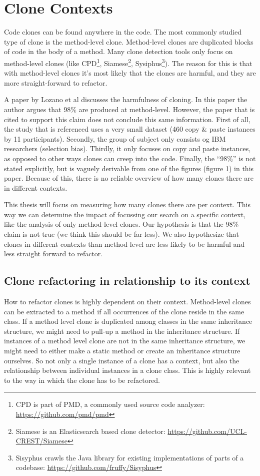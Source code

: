 \documentclass{report}
\theoremstyle{definition}
\theoremstyle{remark}
\begin{document}
\section{Clone Contexts}
Code clones can be found anywhere in the code. The most commonly studied type of clone is the method-level clone. Method-level clones are duplicated blocks of code in the body of a method. Many clone detection tools only focus on method-level clones (like CPD\footnote{CPD is part of PMD, a commonly used source code analyzer: \url{https://github.com/pmd/pmd}}, Siamese\footnote{Siamese is an Elasticsearch based clone detector: \url{https://github.com/UCL-CREST/Siamese}}, Sysiphus\footnote{Sisyphus crawls the Java library for existing implementations of parts of a codebase: \url{https://github.com/fruffy/Sisyphus}}). The reason for this is that with method-level clones it's most likely that the clones are harmful, and they are more straight-forward to refactor.

A paper by Lozano et al \cite{lozano2007evaluating} discusses the harmfulness of cloning. In this paper the author argues that 98\% are produced at method-level. However, the paper that is cited to support this claim \cite{bergman2004ethnographic} does not conclude this same information. First of all, the study that is referenced uses a very small dataset (460 copy \& paste instances by 11 participants). Secondly, the group of subject only consists og IBM researchers (selection bias). Thirdly, it only focuses on copy and paste instances, as opposed to other ways clones can creep into the code. Finally, the ``98\%'' is not stated explicitly, but is vaguely derivable from one of the figures (figure 1) in this paper. Because of this, there is no reliable overview of how many clones there are in different contexts.

This thesis will focus on measuring how many clones there are per context. This way we can determine the impact of focussing our search on a specific context, like the analysis of only method-level clones. Our hypothesis is that the 98\% claim is not true (we think this should be far less). We also hypothesize that clones in different contexts than method-level are less likely to be harmful and less straight forward to refactor.

\subsection{Clone refactoring in relationship to its context}
How to refactor clones is highly dependent on their context. Method-level clones can be extracted to a method \cite{kodhai2013method} if all occurrences of the clone reside in the same class. If a method level clone is duplicated among classes in the same inheritance structure, we might need to pull-up a method in the inheritance structure. If instances of a method level clone are not in the same inheritance structure, we might need to either make a static method or create an inheritance structure ourselves. So not only a single instance of a clone has a context, but also the relationship between individual instances in a clone class. This is highly relevant to the way in which the clone has to be refactored.
\end{document}
